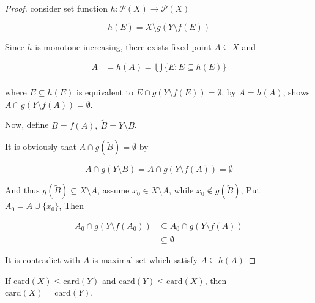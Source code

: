\begin{proof}
    consider set function $h: \mathscr{P}(X) \to \mathscr{P}(X)$

    \[
        h(E) =  X \setminus g(Y \setminus f(E)) 
    \]

    Since $h$ is monotone increasing, there exists fixed point $A \subseteq X$ and

    \begin{align*}
        A &= h(A) = \bigcup \{ E: E \subseteq h(E) \} \\
    \end{align*}

    where $E \subseteq h(E)$ is equivalent to $E \cap g(Y \setminus f(E)) = \emptyset$,
    by $A = h(A)$, shows $A \cap g(Y \setminus f(A)) = \emptyset$.

    Now, define $B = f(A),\: \tilde{B} = Y \setminus B$.

    It is obviously that $A \cap g(\tilde{B}) = \emptyset$ by

    \[
        A \cap g(Y \setminus B) =  A \cap g(Y \setminus f(A)) = \emptyset
    \]

    And thus $g(\tilde{B}) \subseteq X \setminus A$, assume $x_0 \in X \setminus A$, while $x_0 \notin g(\tilde{B})$,
    Put $A_0 = A \cup \{ x_0 \}$, Then

    \begin{align*}
        A_0 \cap g(Y \setminus f(A_0)) & \subseteq A_0  \cap g(Y \setminus f(A)) \\
        & \subseteq \emptyset 
    \end{align*}

    It is contradict with $A$ is maximal set which satisfy $A \subseteq h(A)$

\end{proof}

\begin{thm}
    If $\mathrm{card}(X) \le \mathrm{card}(Y)$ and $\mathrm{card}(Y) \le \mathrm{card}(X)$, then
    $\mathrm{card}(X) = \mathrm{card}(Y)$. 
\end{thm}

